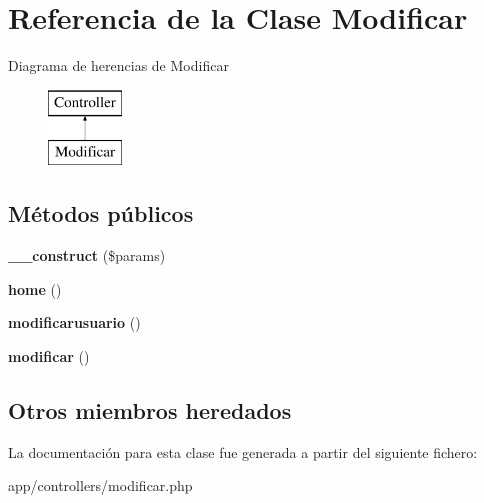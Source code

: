 \hypertarget{class_modificar}{}\section{Referencia de la Clase Modificar}
\label{class_modificar}
Diagrama de herencias de Modificar\begin{figure}[H]
\begin{center}
\leavevmode
\includegraphics[height=2.000000cm]{class_modificar}
\end{center}
\end{figure}
\subsection*{Métodos públicos}
\begin{DoxyCompactItemize}
\item 
\hypertarget{class_modificar_a9162320adff1a1a4afd7f2372f753a3e}{}{\bfseries \+\_\+\+\_\+construct} (\$params)\label{class_modificar_a9162320adff1a1a4afd7f2372f753a3e}

\item 
\hypertarget{class_modificar_a174b8e4c7d4d7363c6f773671defdeff}{}{\bfseries home} ()\label{class_modificar_a174b8e4c7d4d7363c6f773671defdeff}

\item 
\hypertarget{class_modificar_aead84a6ded09739cf40826da2c341900}{}{\bfseries modificarusuario} ()\label{class_modificar_aead84a6ded09739cf40826da2c341900}

\item 
\hypertarget{class_modificar_aa744e58e4ea550a061a2e204f5126a71}{}{\bfseries modificar} ()\label{class_modificar_aa744e58e4ea550a061a2e204f5126a71}

\end{DoxyCompactItemize}
\subsection*{Otros miembros heredados}


La documentación para esta clase fue generada a partir del siguiente fichero\+:\begin{DoxyCompactItemize}
\item 
app/controllers/modificar.\+php\end{DoxyCompactItemize}
